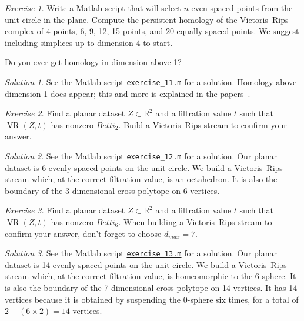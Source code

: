 \documentclass[amscd, amssymb, verbatim]{amsart}[12pt]
\theoremstyle{remark}
\theoremstyle{remark}
\newtheorem{exerciseSol}{Exercise}
\theoremstyle{remark}
\newtheorem*{solution}{Solution}
\DeclareMathOperator{\VR}{VR}
\newcommand{\R}{\mathbb{R}}
\begin{document}
\begin{exerciseSol}
Write a Matlab script that will select $n$ even-spaced points from the unit circle in the plane. Compute the persistent homology of the Vietoris--Rips complex of 4 points, 6, 9, 12, 15 points, and 20 equally spaced points. We suggest including simplices up to dimension 4 to start.

Do you ever get homology in dimension above 1?
\end{exerciseSol}

\begin{solution}
See the Matlab script \href{https://github.com/appliedtopology/javaplex/tree/master/src/matlab/for_distribution/tutorial_solutions/exercise_11.m}{\texttt{exercise\_11.m}} for a solution. Homology above dimension 1 does appear; this and more is explained in the papers~\citep{Adamaszek2013,AAFPP-J,AA-VRS1,AAM}.
\end{solution}

\begin{exerciseSol}
Find a planar dataset $Z \subset \R^2$ and a filtration value $t$ such that $\VR(Z,t)$ has nonzero $Betti_2$. Build a Vietoris--Rips stream to confirm your answer.
\end{exerciseSol}

\begin{solution}
See the Matlab script \href{https://github.com/appliedtopology/javaplex/tree/master/src/matlab/for_distribution/tutorial_solutions/exercise_12.m}{\texttt{exercise\_12.m}} for a solution. Our planar dataset is 6 evenly spaced points on the unit circle. We build a Vietoris--Rips stream which, at the correct filtration value, is an octahedron. It is also the boundary of the 3-dimensional cross-polytope on 6 vertices.
\end{solution}

\begin{exerciseSol}
Find a planar dataset $Z \subset \R^2$ and a filtration value $t$ such that $\VR(Z,t)$ has nonzero $Betti_6$. When building a Vietoris--Rips stream to confirm your answer, don't forget to choose $d_{max} = 7$.
\end{exerciseSol}

\begin{solution}
See the Matlab script \href{https://github.com/appliedtopology/javaplex/tree/master/src/matlab/for_distribution/tutorial_solutions/exercise_13.m}{\texttt{exercise\_13.m}} for a solution. Our planar dataset is 14 evenly spaced points on the unit circle. We build a Vietoris--Rips stream which, at the correct filtration value, is homeomorphic to the 6-sphere. It is also the boundary of the 7-dimensional cross-polytope on 14 vertices. It has 14 vertices because it is obtained by suspending the 0-sphere six times, for a total of $2 + (6 \times 2) = 14$ vertices. 
\end{solution}
\end{document}
